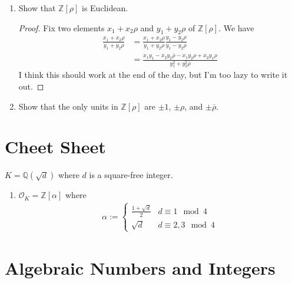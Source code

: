 \begin{example}
    \begin{enumerate}
        \item Show that \(\mathbb{Z}[\rho]\) is Euclidean.
        \begin{proof}
            Fix two elements \(x_1 + x_2 \rho\) and \(y_1 + y_2 \rho\) of \(\mathbb{Z}[\rho]\). We have
            \begin{align*}
                \frac{x_1 + x_2 \rho}{y_1 + y_2 \rho} &= \frac{x_1 + x_2 \rho}{y_1 + y_2 \rho} \frac{y_1 - y_2 \rho}{y_1 - y_2 \rho} \\
                &= \frac{x_1 y_1 - x_2 y_2 \overline{\rho}  - x_1 y_2 \rho + x_2 y_1 \rho}{y_1^2 + y_2^2 \overline{\rho}}
            \end{align*}
            I think this should work at the end of the day, but I'm too lazy to write it out.
        \end{proof}
        \item Show that the only units in \(\mathbb{Z}[\rho]\) are \(\pm 1\), \(\pm \rho\), and \(\pm \overline{\rho}\).
    \end{enumerate}
\end{example}

\chapter{Cheet Sheet}

\noindent \(K = \mathbb{Q}(\sqrt{d})\) where \(d\) is a square-free integer.
\begin{enumerate}
    \item \(\mathcal{O}_K = \mathbb{Z}[\alpha]\) where
    \begin{align*}
        \alpha := \begin{cases}
            \frac{1 + \sqrt{d}}{2} & d \equiv 1 \mod{4} \\
            \sqrt{d} & d \equiv 2, 3 \mod{4}
        \end{cases}
    \end{align*}
\end{enumerate}

\chapter{Algebraic Numbers and Integers}

